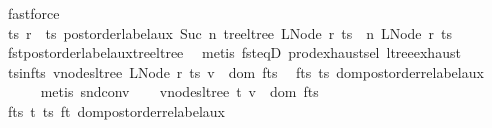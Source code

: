 \begin{isabellebody}
\ fastforce\isanewline
\ \ \isamarkupfalse%
\ \isamarkupfalse%
\ ts{\isacharprime}{\kern0pt}\ r{\isacharprime}{\kern0pt}\ \ ts{\isacharprime}{\kern0pt}{\isacharcolon}{\kern0pt}\ {\isachardoublequoteopen}postorder{\isacharunderscore}{\kern0pt}label{\isacharunderscore}{\kern0pt}aux\ {\isacharparenleft}{\kern0pt}Suc\ n{\isacharprime}{\kern0pt}{\isacharparenright}{\kern0pt}\ {\isacharparenleft}{\kern0pt}tree{\isacharunderscore}{\kern0pt}ltree\ {\isacharparenleft}{\kern0pt}LNode\ r\ ts{\isacharparenright}{\kern0pt}{\isacharparenright}{\kern0pt}\ {\isacharequal}{\kern0pt}\ {\isacharparenleft}{\kern0pt}n{\isacharprime}{\kern0pt}{\isacharprime}{\kern0pt}{\isacharcomma}{\kern0pt}\ LNode\ r{\isacharprime}{\kern0pt}\ ts{\isacharprime}{\kern0pt}{\isacharparenright}{\kern0pt}{\isachardoublequoteclose}\isanewline
\ \ \ \ \isamarkupfalse%
\ fst{\isacharunderscore}{\kern0pt}postorder{\isacharunderscore}{\kern0pt}label{\isacharunderscore}{\kern0pt}aux{\isacharunderscore}{\kern0pt}tree{\isacharunderscore}{\kern0pt}ltree\ \isamarkupfalse%
\ {\isacharparenleft}{\kern0pt}metis\ fst{\isacharunderscore}{\kern0pt}eqD\ prod{\isachardot}{\kern0pt}exhaust{\isacharunderscore}{\kern0pt}sel\ ltree{\isachardot}{\kern0pt}exhaust{\isacharparenright}{\kern0pt}\isanewline
\ \ \isamarkupfalse%
\ ts{\isacharprime}{\kern0pt}{\isacharunderscore}{\kern0pt}in{\isacharunderscore}{\kern0pt}f{\isacharunderscore}{\kern0pt}ts{\isacharcolon}{\kern0pt}\ {\isachardoublequoteopen}{\isasymforall}v{\isasymin}nodes{\isacharunderscore}{\kern0pt}ltree\ {\isacharparenleft}{\kern0pt}LNode\ r{\isacharprime}{\kern0pt}\ ts{\isacharprime}{\kern0pt}{\isacharparenright}{\kern0pt}{\isachardot}{\kern0pt}\ v\ {\isasymin}\ dom\ f{\isacharunderscore}{\kern0pt}ts{\isachardoublequoteclose}\ \isamarkupfalse%
\ f{\isacharunderscore}{\kern0pt}ts\ ts{\isacharprime}{\kern0pt}\ dom{\isacharunderscore}{\kern0pt}postorder{\isacharunderscore}{\kern0pt}relabel{\isacharunderscore}{\kern0pt}aux\isanewline
\ \ \ \ \isamarkupfalse%
\ {\isacharparenleft}{\kern0pt}metis\ snd{\isacharunderscore}{\kern0pt}conv{\isacharparenright}{\kern0pt}\isanewline
\ \ \isamarkupfalse%
\ {\isachardoublequoteopen}{\isasymforall}v{\isasymin}nodes{\isacharunderscore}{\kern0pt}ltree\ t{\isacharprime}{\kern0pt}{\isachardot}{\kern0pt}\ v\ {\isasymnotin}\ dom\ f{\isacharunderscore}{\kern0pt}ts{\isachardoublequoteclose}\ \isamarkupfalse%
\ f{\isacharunderscore}{\kern0pt}ts\ t{\isacharprime}{\kern0pt}\ ts{\isacharprime}{\kern0pt}\ f{\isacharunderscore}{\kern0pt}t\ dom{\isacharunderscore}{\kern0pt}postorder{\isacharunderscore}{\kern0pt}relabel{\isacharunderscore}{\kern0pt}aux\isanewline

\end{isabellebody}

